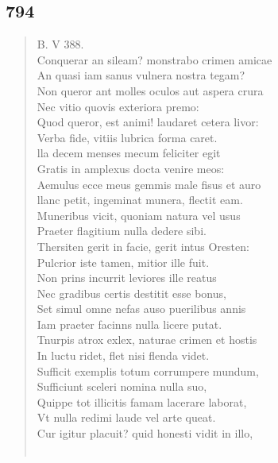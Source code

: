 \documentclass[11pt, a4paper]{report}
\begin{document}
            \subsection*{794}
      \begin{verse}
      B. V 388. \\ Conquerar an sileam? monstrabo crimen amicae \\ An quasi iam sanus vulnera nostra tegam? \\ Non queror ant molles oculos aut aspera crura \\ Nec vitio quovis exteriora premo: \\ Quod queror, est animi! laudaret cetera livor: \\ Verba fide, vitiis lubrica forma caret. \\ lla decem menses mecum feliciter egit \\ Gratis in amplexus docta venire meos: \\ Aemulus ecce meus gemmis male fisus et auro \\ llanc petit, ingeminat munera, flectit eam. \\ Muneribus vicit, quoniam natura vel usus \\ Praeter flagitium nulla dedere sibi. \\ Thersiten gerit in facie, gerit intus Oresten: \\ Pulcrior iste tamen, mitior ille fuit. \\ Non prins incurrit leviores ille reatus \\ Nec gradibus certis destitit esse bonus, \\ Set simul omne nefas auso puerilibus annis \\ Iam praeter facinns nulla licere putat. \\ Tnurpis atrox exlex, naturae crimen et hostis \\ In luctu ridet, flet nisi flenda videt. \\ Sufficit exemplis totum corrumpere mundum, \\ Sufficiunt sceleri nomina nulla suo, \\ Quippe tot illicitis famam lacerare laborat, \\ Vt nulla redimi laude vel arte queat. \\ Cur igitur placuit? quid honesti vidit in illo, \\ 
        ﻿\pagebreak 

\end{verse}
\end{document}
